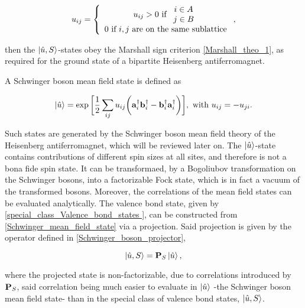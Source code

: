 \documentclass{homework}
\begin{document}
\begin{equation}
    u_{ij} = \left\{\begin{array}{c}
       u_{ij} > 0  \textnormal{ if } \begin{array}{c}
            i \in A  \\
            j \in B
       \end{array}  \\
       0 \textnormal{ if $i,j$ are on the same sublattice}
    \end{array}\right.,
\end{equation}

then the $\ket{\hat{u}, S}$-states obey the Marshall sign criterion \cref{Marshall_theo_1}, as required for the ground state of a bipartite Heisenberg antiferromagnet. 

\clearpage 

A Schwinger boson mean field state is defined as 

\begin{equation}
    \ket{\hat{u}} = \exp \bigg[\frac{1}{2} \sum_{ij} u_{ij} \bigg({\bf a}_i^\dagger {\bf b}_i^\dagger - {\bf b}_i^\dagger {\bf a}_i^\dagger\bigg)\bigg], \textnormal{ with } u_{ij} = -u_{ji}.
    \label{Schwinger_mean_field_state}
\end{equation}

Such states are generated by the Schwinger boson mean field theory of the Heisenberg antiferromagnet, which will be reviewed later on. The $\ket{\hat{u}}$-state contains contributions of different spin sizes at all sites, and therefore is not a bona fide spin state. It can be transformaed, by a Bogoliubov transformation on the Schwinger bosons, into a factorizable Fock state, which is in fact a vacuum of the transformed bosons. Moreover, the correlations of the mean field states can be evaluated analytically. The valence bond state, given by \cref{special_class_Valence_bond_states }, can be constructed from \cref{Schwinger_mean_field_state} via a projection. Said projection is given by the operator defined in \cref{Schwinger_boson_projector},

$$
    \ket{\hat{u}, S} = \mathbf{P}_S \ket{\hat{u}},
$$

where the projected state is non-factorizable, due to correlations introduced by ${\bf P}_S$, said correlation being much easier to evaluate in $\ket{\hat{u}}$ -the Schwinger boson mean field state- than in the special class of valence bond states, $\ket{\hat{u}, S}$. \\
\end{document}
